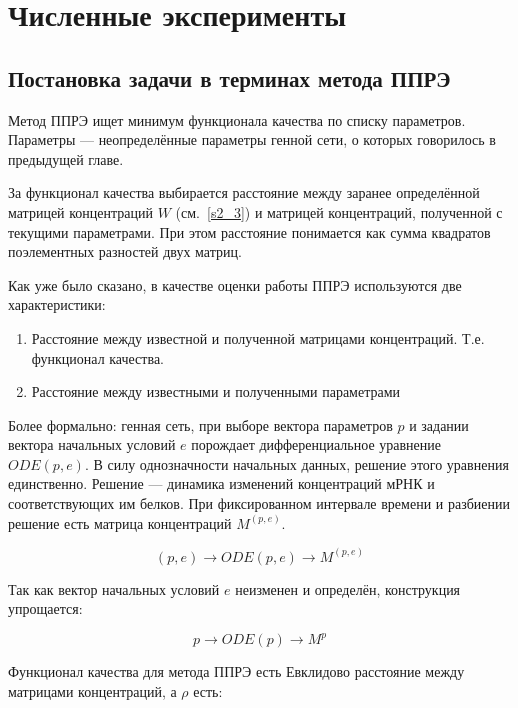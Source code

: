 \clearpage
\section{Численные эксперименты} \label{s3}

\subsection{Постановка задачи в терминах метода ППРЭ} \label{s3_1}

Метод ППРЭ ищет минимум функционала качества по списку параметров. Параметры — 
неопределённые параметры генной сети, о которых говорилось в предыдущей главе. 

За функционал качества выбирается расстояние между заранее определённой матрицей 
концентраций $W$ (см.~\ref{s2_3}) и матрицей концентраций, полученной с текущими 
параметрами. При этом расстояние понимается как сумма квадратов поэлементных 
разностей двух матриц. 

Как уже было сказано, в качестве оценки работы ППРЭ используются две 
характеристики: 
\begin{enumerate}
	\item Расстояние между известной и полученной матрицами концентраций. Т.е. 
	функционал качества.
	\item Расстояние между известными и полученными параметрами
\end{enumerate}

Более формально: генная сеть, при выборе вектора параметров $p$ и задании
вектора начальных условий $e$ порождает дифференциальное уравнение $ODE(p,e)$. В 
силу однозначности начальных данных, решение этого уравнения единственно. 
Решение — динамика изменений концентраций мРНК и соответствующих им белков. При
фиксированном интервале времени и разбиении решение есть матрица концентраций 
$M^{(p,e)}$.

\[ (p,e) \rightarrow ODE(p,e) \rightarrow M^{(p,e)} \]

Так как вектор начальных условий $e$ неизменен и определён, конструкция 
упрощается:

\[ p \rightarrow ODE(p) \rightarrow M^p \]

Функционал качества для метода ППРЭ есть Евклидово расстояние между матрицами 
концентраций, а $\rho$ есть:

